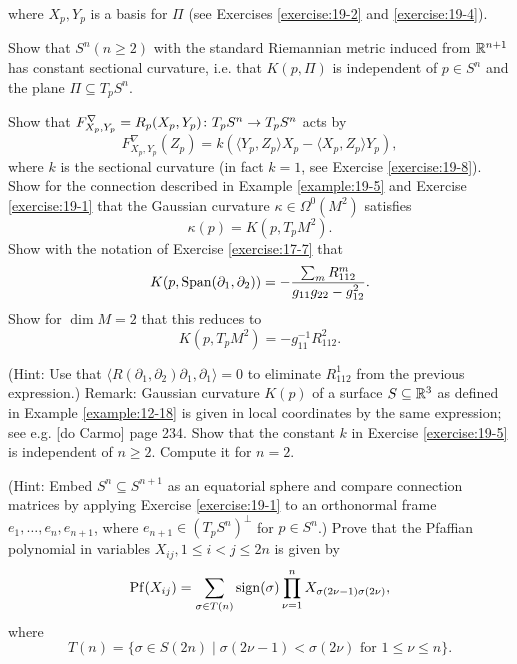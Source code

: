 \begin{enumerate}[\theexercise.1]
\[    \]
    where ${X}_{p},{Y}_{p}$ is a basis for $\Pi$ (see Exercises \ref{exercise:19-2} and \ref{exercise:19-4}).\par
    Show that ${S}^{n}( {n \geq  2})$ with the standard Riemannian metric induced from ${\mathbb{R}}^{n + 1}$ has constant sectional curvature, i.e. that $K( {p,\Pi })$ is independent of $p \in  {S}^{n}$ and the plane $\Pi  \subseteq  {T}_{p}{S}^{n}$.\par
    Show that ${F}_{{X}_{p},{Y}_{p}}^{\nabla } = {R}_{p}( {{X}_{p},{Y}_{p}})\colon {T}_{p}{S}^{n} \rightarrow  {T}_{p}{S}^{n}$ acts by
    \[
      {F}_{{X}_{p},{Y}_{p}}^{\nabla }( {Z}_{p})  = k( {\langle  {{Y}_{p},{Z}_{p}}\rangle  {X}_{p}- \langle  {{X}_{p},{Z}_{p}}\rangle  {Y}_{p}}),
    \]
    where $k$ is the sectional curvature (in fact $k = 1$, see Exercise \ref{exercise:19-8}).
  \NewItem Show for the connection described in Example \ref{example:19-5} and Exercise \ref{exercise:19-1} that the Gaussian curvature $\kappa  \in  {\Omega }^{0}( {M}^{2})$ satisfies
    \[
      \kappa ( p)  = K( {p,{T}_{p}{M}^{2}}).
    \]
  \NewItem Show with the notation of Exercise \ref{exercise:17-7} that
    \[
      K( {p,\mathrm{Span}( {{\partial }_{1},{\partial }_{2}}) })  = - \frac{\sum_{m}{R}_{112}^{m}}{{g}_{11}{g}_{22}- {g}_{12}^{2}}.
    \]
    Show for $\dim M = 2$ that this reduces to
    \[
      K( {p,{T}_{p}{M}^{2}})  = - {g}_{11}^{-1}{R}_{112}^{2}.
    \]
    \par(Hint: Use that $\langle  {R( {{\partial }_{1},{\partial }_{2}}) {\partial }_{1},{\partial }_{1}}\rangle   = 0$ to eliminate ${R}_{112}^{1}$ from the previous expression.)
    Remark: Gaussian curvature $K( p)$ of a surface $S \subseteq  {\ensuremath{\mathbb{R}}}^{3}$ as defined in Example \ref{example:12-18} is given in local coordinates by the same expression; see e.g. [do Carmo]\supercite{do-Carmo} page 234.
  \NewItem Show that the constant $k$ in Exercise \ref{exercise:19-5} is independent of $n \geq  2$. Compute it for $n = 2$.
    \par(Hint: Embed ${S}^{n} \subseteq  {S}^{n + 1}$ as an equatorial sphere and compare connection matrices by applying Exercise \ref{exercise:19-1} to an orthonormal frame ${e}_{1},\ldots,{e}_{n},{e}_{n + 1}$, where ${e}_{n + 1} \in  {( {T}_{p}{S}^{n}) }^{ \bot  }$ for $p \in  {S}^{n}$.)
  \NewItem Prove that the Pfaffian polynomial in variables ${X}_{ij},1 \leq  i < j \leq  {2n}$ is given by
    \[
      \mathrm{Pf}( {X}_{ij})  = \sum_{{\sigma  \in  T( n) }}\mathrm{sign}( \sigma ) \prod_{\nu  = 1}^{n}{X}_{\sigma ( {{2\nu }- 1}) \sigma ( {2\nu }) },
    \]
    where
    \[
      T( n)  = \{ \sigma  \in  S( {2n})  \mid  \sigma ( {{2\nu }- 1})  < \sigma ( {2\nu }) \text{ for }1 \leq  \nu  \leq  n\}.
\]
\end{enumerate}

